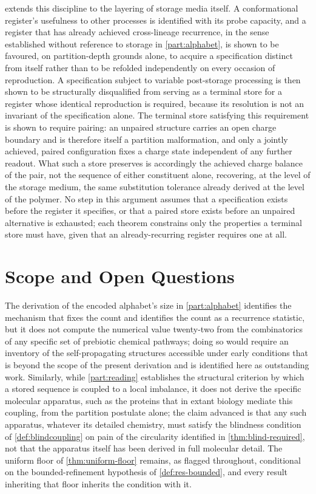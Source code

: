 \documentclass[11pt,twocolumn,a4paper]{article}
\theoremstyle{plain}
\theoremstyle{definition}
\theoremstyle{remark}
\begin{document}
 extends this discipline to the layering of storage
media itself. A conformational register's usefulness to other processes is
identified with its probe capacity, and a register that has already
achieved cross-lineage recurrence, in the sense established without
reference to storage in \cref{part:alphabet}, is shown to be favoured, on
partition-depth grounds alone, to acquire a specification distinct from
itself rather than to be refolded independently on every occasion of
reproduction. A specification subject to variable post-storage processing
is then shown to be structurally disqualified from serving as a terminal
store for a register whose identical reproduction is required, because
its resolution is not an invariant of the specification alone. The
terminal store satisfying this requirement is shown to require pairing:
an unpaired structure carries an open charge boundary and is therefore
itself a partition malformation, and only a jointly achieved, paired
configuration fixes a charge state independent of any further readout.
What such a store preserves is accordingly the achieved charge balance of
the pair, not the sequence of either constituent alone, recovering, at the
level of the storage medium, the same substitution tolerance already
derived at the level of the polymer. No step in this argument assumes that
a specification exists before the register it specifies, or that a paired
store exists before an unpaired alternative is exhausted; each theorem
constrains only the properties a terminal store must have, given that an
already-recurring register requires one at all.

\section{Scope and Open Questions}
\label{sec:limitations}

The derivation of the encoded alphabet's size in \cref{part:alphabet}
identifies the mechanism that fixes the count and identifies the count as a
recurrence statistic, but it does not compute the numerical value
twenty-two from the combinatorics of any specific set of prebiotic
chemical pathways; doing so would require an inventory of the
self-propagating structures accessible under early conditions that is
beyond the scope of the present derivation and is identified here as
outstanding work. Similarly, while \cref{part:reading} establishes the
structural criterion by which a stored sequence is coupled to a local
imbalance, it does not derive the specific molecular apparatus, such as the
proteins that in extant biology mediate this coupling, from the partition
postulate alone; the claim advanced is that any such apparatus, whatever its
detailed chemistry, must satisfy the blindness condition of
\cref{def:blindcoupling} on pain of the circularity identified in
\cref{thm:blind-required}, not that the apparatus itself has been derived
in full molecular detail. The uniform floor of \cref{thm:uniform-floor}
remains, as flagged throughout, conditional on the bounded-refinement
hypothesis of \cref{def:res-bounded}, and every result inheriting that floor
inherits the condition with it.
\end{document}
